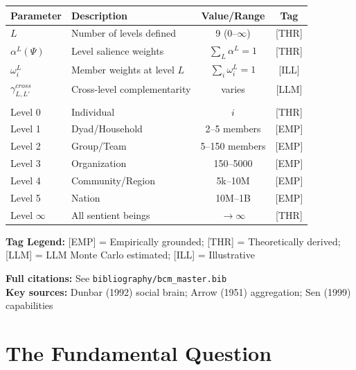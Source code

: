\begin{tcolorbox}[colback=blue!5!white, colframe=blue!75!black,
    title=\textbf{Epistemic Status: Key Parameters}]

\renewcommand{\arraystretch}{1.3}
\begin{tabular}{@{}llcc@{}}
\toprule
\textbf{Parameter} & \textbf{Description} & \textbf{Value/Range} & \textbf{Tag} \\
\midrule
$L$ & Number of levels defined & 9 (0--$\infty$) & [THR] \\
$\alpha^L(\Psi)$ & Level salience weights & $\sum_L \alpha^L = 1$ & [THR] \\
$\omega^L_i$ & Member weights at level $L$ & $\sum_i \omega^L_i = 1$ & [ILL] \\
$\gamma^{cross}_{L,L'}$ & Cross-level complementarity & varies & [LLM] \\
\addlinespace
\multicolumn{4}{@{}l}{\textit{Level definitions:}} \\
Level 0 & Individual & $i$ & [THR] \\
Level 1 & Dyad/Household & 2--5 members & [EMP] \\
Level 2 & Group/Team & 5--150 members & [EMP] \\
Level 3 & Organization & 150--5000 & [EMP] \\
Level 4 & Community/Region & 5k--10M & [EMP] \\
Level 5 & Nation & 10M--1B & [EMP] \\
Level $\infty$ & All sentient beings & $\rightarrow \infty$ & [THR] \\
\bottomrule
\end{tabular}

\vspace{0.5em}
\textbf{Tag Legend:} [EMP] = Empirically grounded; [THR] = Theoretically derived;
[LLM] = LLM Monte Carlo estimated; [ILL] = Illustrative

\end{tcolorbox}

\noindent\textbf{Full citations:} See \texttt{bibliography/bcm\_master.bib} \\
\textbf{Key sources:} Dunbar (1992) social brain; Arrow (1951) aggregation; Sen (1999) capabilities

\vspace{1em}

\section{The Fundamental Question}
\label{sec:aaa-fundamental}

